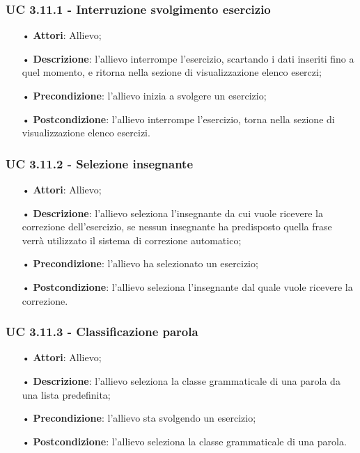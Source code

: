 \subsubsection{UC 3.11.1 - Interruzione svolgimento esercizio}
\begin{itemize}
	\item[•]\textbf{Attori}: Allievo;
	\item[•]\textbf{Descrizione}: l'allievo interrompe  l'esercizio, scartando i dati inseriti fino a quel momento, e ritorna nella sezione di visualizzazione elenco eserczi;
	\item[•]\textbf{Precondizione}: l'allievo inizia a svolgere un esercizio;
	\item[•]\textbf{Postcondizione}: l'allievo interrompe l'esercizio, torna nella sezione di visualizzazione elenco esercizi.
\end{itemize}

\subsubsection{UC 3.11.2 - Selezione insegnante}
\begin{itemize}
	\item[•]\textbf{Attori}: Allievo;
	\item[•]\textbf{Descrizione}: l'allievo seleziona l'insegnante da cui vuole ricevere la correzione dell'esercizio, se nessun insegnante ha predisposto quella frase verrà utilizzato il sistema di correzione automatico; %
	\item[•]\textbf{Precondizione}: l'allievo ha selezionato un esercizio;
	\item[•]\textbf{Postcondizione}: l'allievo seleziona l'insegnante dal quale vuole ricevere la correzione.
\end{itemize}

\subsubsection{UC 3.11.3 - Classificazione parola}
\begin{itemize}
	\item[•]\textbf{Attori}: Allievo;
	\item[•]\textbf{Descrizione}: l'allievo seleziona la classe grammaticale di una parola da una lista predefinita;
	\item[•]\textbf{Precondizione}: l'allievo sta svolgendo un esercizio;
	\item[•]\textbf{Postcondizione}: l'allievo seleziona la classe grammaticale di una parola.
\end{itemize}


